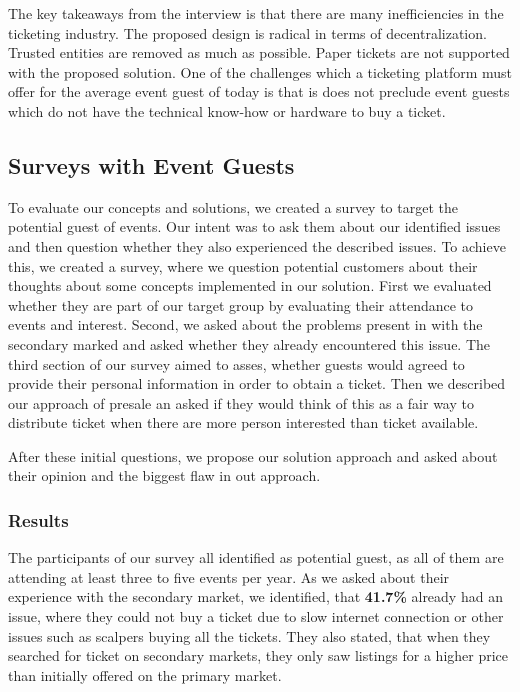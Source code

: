 The key takeaways from the interview is that there are many inefficiencies in the ticketing industry. The proposed design is radical in terms of decentralization. Trusted entities are removed as much as possible. Paper tickets are not supported with the proposed solution. One of the challenges which a ticketing platform must offer for the average event guest of today is that is does not preclude event guests which do not have the technical know-how or hardware to buy a ticket.

\subsection{Surveys with Event Guests}

To evaluate our concepts and solutions, we created a survey to target the potential guest of events. Our intent was to ask them about our identified issues and then question whether they also experienced the described issues. To achieve this, we created a survey, where we question potential customers about their thoughts about some concepts implemented in our solution. First we evaluated whether they are part of our target group by evaluating their attendance to events and interest. 
Second, we asked about the problems present in with the secondary marked and asked whether they already encountered this issue. The third section of our survey aimed to asses, whether guests would agreed to provide their personal information in order to obtain a  ticket. Then we described our approach of presale an asked if they would think of this as a fair way to distribute ticket when there are more person interested than ticket available. 

After these initial questions, we propose our solution approach and asked about their opinion and the biggest flaw in out approach.

\subsubsection{Results}
The participants of our survey all identified as potential guest, as all of them are attending at least three to five events per year. As we asked about their experience with the secondary market, we identified, that \textbf{41.7\%} already had an issue, where they could not buy a ticket due to slow internet connection or other issues such as scalpers buying all the tickets. They also stated, that when they searched for ticket on secondary markets, they only saw listings for a higher price than initially offered on the primary market.


